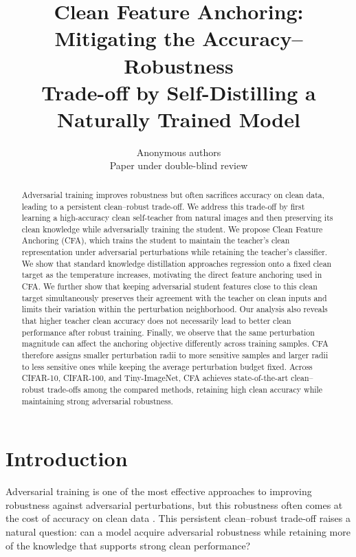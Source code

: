 \documentclass{article} %
\title{Clean Feature Anchoring: Mitigating the Accuracy--Robustness\\
Trade-off by Self-Distilling a Naturally Trained Model}
\author{
Anonymous authors\\
Paper under double-blind review
}
\theoremstyle{plain}
\begin{document}
\maketitle


\begin{abstract}
Adversarial training improves robustness but often sacrifices accuracy on clean
data, leading to a persistent clean--robust trade-off. We address this trade-off
by first learning a high-accuracy clean self-teacher from natural images and then
preserving its clean knowledge while adversarially training the student. We
propose Clean Feature Anchoring (CFA), which trains the student to maintain the
teacher's clean representation under adversarial perturbations while retaining
the teacher's classifier.
We show that standard knowledge distillation approaches regression onto a fixed
clean target as the temperature increases, motivating the direct feature
anchoring used in CFA. We further show that keeping adversarial student features
close to this clean target simultaneously preserves their agreement with the
teacher on clean inputs and limits their variation within the perturbation
neighborhood. Our analysis also reveals that higher teacher clean accuracy does
not necessarily lead to better clean performance after robust training.
Finally, we observe that the same perturbation magnitude can affect the anchoring
objective differently across training samples. CFA therefore assigns smaller
perturbation radii to more sensitive samples and larger radii to less sensitive
ones while keeping the average perturbation budget fixed. Across CIFAR-10,
CIFAR-100, and Tiny-ImageNet, CFA achieves state-of-the-art clean--robust
trade-offs among the compared methods, retaining high clean accuracy while
maintaining strong adversarial robustness.
\end{abstract}

\section{Introduction}
\label{sec:intro}

Adversarial training is one of the most effective approaches to improving
robustness against adversarial perturbations, but this robustness often comes
at the cost of accuracy on clean data
\citep{PGD,tsipras2018robustness,TRADES}. This persistent clean--robust
trade-off raises a natural question: can a model acquire adversarial robustness
while retaining more of the knowledge that supports strong clean performance?
\end{document}
